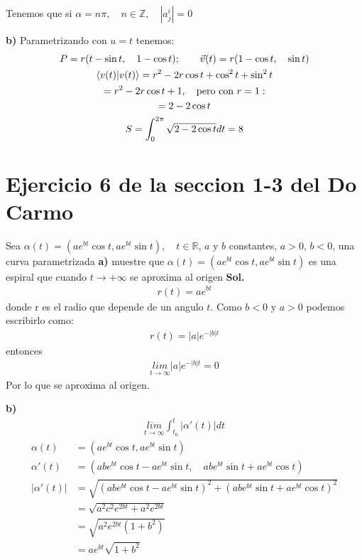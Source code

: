 \documentclass{article}
\begin{document}
Tenemos que si $ \alpha = n \pi, \quad n\in \mathbb{Z}, \quad \left|a _{j } ^ {i }\right| = 0  $

\textbf{b) } Parametrizando con $ u = t  $ tenemos: 
\begin{gather*}
  P =  r(t - \sin{t }, \quad 1- \cos{t }); \qquad \vec v (t) = r (1 - \cos{t }, \quad \sin{t }) \\
  \bra{v(t)}\ket{v(t)} = r ^2 - 2 r \cos{t } + \cos ^2{t} + \sin ^2{t}\\
  = r ^2 - 2 r \cos{t } + 1, \quad \text{pero con }r = 1: \\
  = 2 - 2 \cos{t }\\
  S = \int_{0 }^{2 \pi}\sqrt{2 - 2 \cos{t }} dt = 8 
\end{gather*}

\section{Ejercicio 6 de la seccion 1-3 del Do Carmo }
Sea $ \alpha(t) = (a e ^ {bt }\cos{t }, a e ^ {b t } \sin{t }), \quad t \in \mathbb{R} $, $ a  $ y $ b  $ constantes, $ a > 0  $, $ b <0  $, una curva parametrizada
\textbf{a) } muestre que $ \alpha(t) = (a e ^ {b t } \cos{t }, a e ^ {bt } \sin{t }) $ es una espiral que cuando $ t \rightarrow + \infty $ se aproxima al origen 
\textbf{Sol. } 
\begin{gather*}
  r(t) = a e ^ {bt } 
\end{gather*}
donde r es el radio que depende de un angulo $ t  $. Como $ b<0  $ y $ a >0  $ podemos escribirlo como: 
\begin{gather*}
  r(t) = \left|a \right|e ^ {-\left|b \right|t }
\end{gather*}
entonces 
\begin{gather*}
  \underset{t \rightarrow \infty}{lim }\left|a \right|e ^ {- \left|b \right|t } = 0  
\end{gather*}
Por lo que se aproxima al origen.

\textbf{b) }
\begin{gather*}
  \underset{t \rightarrow \infty}{lim }\int_{t_0 }^{t } \left|\alpha'(t)\right|dt 
\end{gather*}
\begin{align*}
  \alpha(t) &= (a e ^ {bt }\cos{t }, a e ^ {bt }\sin{t })\\
  \alpha' (t) &= (a b e ^ {bt }\cos{t }- a e ^ {bt } \sin{t },\quad ab e ^ {bt } \sin{t }+ a e ^ {bt } \cos{t })\\
  \left|\alpha' (t) \right| &= \sqrt{(a b e ^ {bt }\cos{t }- a e ^ {bt } \sin{t }) ^2 + (ab e ^ {bt } \sin{t }+ a e ^ {bt } \cos{t })^2} \\
  &= \sqrt{a ^2 c ^2 e ^ {2bt } + a ^2 e ^ {2bt }} \\
  &= \sqrt{a ^2 e ^ {2bt }(1 + b ^2)} \\
  &= a e ^ {bt } \sqrt{1 + b ^2} 
\end{align*}
\end{document}
